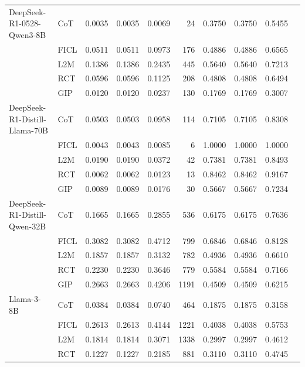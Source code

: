 \documentclass[conference]{IEEEtran}
\begin{document}
\begin{longtable}{p{3.5cm} l r r r r r r r r}
  \bottomrule
DeepSeek-R1-0528-Qwen3-8B & CoT  & 0.0035 & 0.0035 & 0.0069 & 24 & 0.3750 & 0.3750 & 0.5455 \\
                          & FICL & 0.0511 & 0.0511 & 0.0973 & 176 & 0.4886 & 0.4886 & 0.6565 \\
                          & L2M  & 0.1386 & 0.1386 & 0.2435 & 445 & 0.5640 & 0.5640 & 0.7213 \\
                          & RCT  & 0.0596 & 0.0596 & 0.1125 & 208 & 0.4808 & 0.4808 & 0.6494 \\
                          & GIP  & 0.0120 & 0.0120 & 0.0237 & 130 & 0.1769 & 0.1769 & 0.3007 \\ \addlinespace
DeepSeek-R1-Distill-Llama-70B & CoT  & 0.0503 & 0.0503 & 0.0958 & 114 & 0.7105 & 0.7105 & 0.8308 \\
                          & FICL & 0.0043 & 0.0043 & 0.0085 & 6 & 1.0000 & 1.0000 & 1.0000 \\
                          & L2M  & 0.0190 & 0.0190 & 0.0372 & 42 & 0.7381 & 0.7381 & 0.8493 \\
                          & RCT  & 0.0062 & 0.0062 & 0.0123 & 13 & 0.8462 & 0.8462 & 0.9167 \\
                          & GIP  & 0.0089 & 0.0089 & 0.0176 & 30 & 0.5667 & 0.5667 & 0.7234 \\ \addlinespace
DeepSeek-R1-Distill-Qwen-32B & CoT  & 0.1665 & 0.1665 & 0.2855 & 536 & 0.6175 & 0.6175 & 0.7636 \\
                          & FICL & 0.3082 & 0.3082 & 0.4712 & 799 & 0.6846 & 0.6846 & 0.8128 \\
                          & L2M  & 0.1857 & 0.1857 & 0.3132 & 782 & 0.4936 & 0.4936 & 0.6610 \\
                          & RCT  & 0.2230 & 0.2230 & 0.3646 & 779 & 0.5584 & 0.5584 & 0.7166 \\
                          & GIP  & 0.2663 & 0.2663 & 0.4206 & 1191 & 0.4509 & 0.4509 & 0.6215 \\ \addlinespace
Llama-3-8B & CoT  & 0.0384 & 0.0384 & 0.0740 & 464 & 0.1875 & 0.1875 & 0.3158 \\
           & FICL & 0.2613 & 0.2613 & 0.4144 & 1221 & 0.4038 & 0.4038 & 0.5753 \\
           & L2M  & 0.1814 & 0.1814 & 0.3071 & 1338 & 0.2997 & 0.2997 & 0.4612 \\
           & RCT  & 0.1227 & 0.1227 & 0.2185 & 881 & 0.3110 & 0.3110 & 0.4745 \\

\end{longtable}
\end{document}
